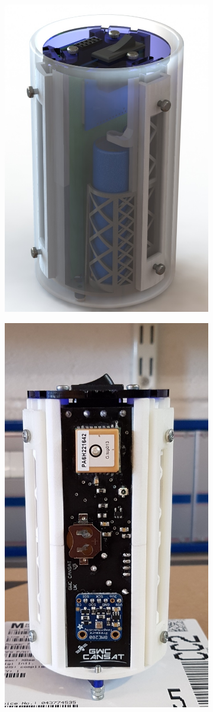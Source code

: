 \documentclass[]{report}
\begin{document}
\begin{figure}
	\centering
	\begin{subfigure}{.5\textwidth}
		\centering
		\includegraphics[width=.8\linewidth]{CanSat_render.jpg}
	\end{subfigure}%
	\begin{subfigure}{.5\textwidth}
		\centering
		\includegraphics[width=0.6\linewidth]{new_cansat.jpg}

\end{subfigure}
\end{figure}
\end{document}

